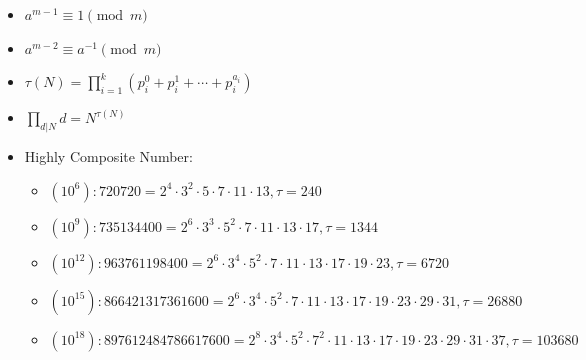 \begin{itemize}
	\item $a^{m-1} \equiv 1 \pmod{m}$
	\item $a^{m-2} \equiv a^{-1} \pmod{m}$
	\item $\tau(N) = \prod_{i=1}^{k}(p_i^{0} + p_i^{1} + \cdots + p_i^{a_i})$
	\item $\prod\limits_{d|N}d = N^{\tau(N)}$
	\item Highly Composite Number:
	\begin{itemize}
		\item $(10^6): 720720 = 2^4 \cdot 3^2 \cdot 5 \cdot 7 \cdot 11 \cdot 13, \tau = 240$
		\item $(10^9): 735134400 = 2^6 \cdot 3^3 \cdot 5^2 \cdot 7 \cdot 11 \cdot 13 \cdot 17, \tau = 1344$
		\item $(10^{12}): 963761198400 = 2^6 \cdot 3^4 \cdot 5^2 \cdot 7 \cdot 11 \cdot 13 \cdot 17 \cdot 19 \cdot 23, \tau = 6720$
		\item $(10^{15}): 866421317361600 = 2^6 \cdot 3^4 \cdot 5^2 \cdot 7 \cdot 11 \cdot 13 \cdot 17 \cdot 19 \cdot 23 \cdot 29 \cdot 31, \tau = 26880$
		\item $(10^{18}): 897612484786617600 = 2^8 \cdot 3^4 \cdot 5^2 \cdot 7^2 \cdot 11 \cdot 13 \cdot 17 \cdot 19 \cdot 23 \cdot 29 \cdot 31 \cdot 37, \tau = 103680$
	\end{itemize}
\end{itemize}